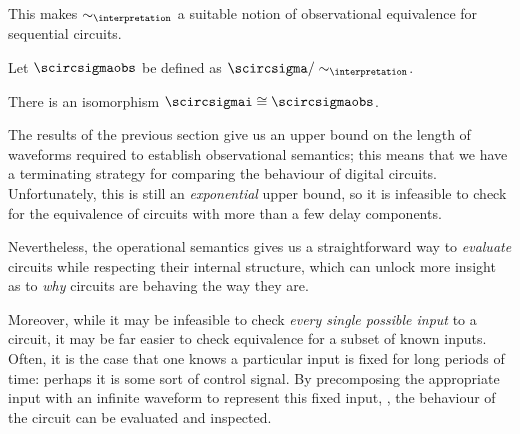 This makes \(\sim_\interpretation\) a suitable notion of observational
equivalence for sequential circuits.

\begin{definition}
    Let \(\scircsigmaobs\) be defined as
    \(\scircsigma / \sim_{\interpretation}\).
\end{definition}

\begin{corollary}
    There is an isomorphism \(\scircsigmai \cong \scircsigmaobs\).
\end{corollary}

The results of the previous section give us an upper bound on the length of
waveforms required to establish observational semantics; this means that we have
a terminating strategy for comparing the behaviour of digital circuits.
Unfortunately, this is still an \emph{exponential} upper bound, so it is
infeasible to check for the equivalence of circuits with more than a few delay
components.

Nevertheless, the operational semantics gives us a straightforward way to
\emph{evaluate} circuits while respecting their internal structure, which can
unlock more insight as to \emph{why} circuits are behaving the way they
are.

Moreover, while it may be infeasible to check \emph{every single possible input}
to a circuit, it may be far easier to check equivalence for a subset of known
inputs.
Often, it is the case that one knows a particular input is fixed for long
periods of time: perhaps it is some sort of control signal.
By precomposing the appropriate input with an infinite waveform to represent
this fixed input, , the behaviour of the circuit can be evaluated and inspected.